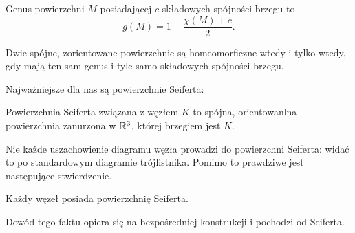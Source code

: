 \begin{definition} 
    Genus powierzchni $M$ posiadającej $c$ składowych spójności brzegu to
    \[
        g(M) = 1 - \frac{\chi(M) + c}{2}.
    \]
\end{definition}

\begin{proposition}
    Dwie spójne, zorientowane powierzchnie są homeomorficzne wtedy i tylko
    wtedy, gdy mają ten sam genus i tyle samo składowych spójności brzegu.
\end{proposition}

Najważniejsze dla nas są powierzchnie Seiferta:

\begin{definition} 
    Powierzchnia Seiferta związana z węzłem $K$ to spójna,
    orientowanlna powierzchnia zanurzona w $\mathbb R^3$, której brzegiem jest $K$.
\end{definition}


Nie każde uszachowienie diagramu węzła prowadzi do powierzchni Seiferta:
widać to po standardowym diagramie trójlistnika.
Pomimo to prawdziwe jest następujące stwierdzenie.

\begin{proposition}
    Każdy węzeł posiada powierzchnię Seiferta.
\end{proposition}

Dowód tego faktu opiera się na bezpośredniej konstrukcji i pochodzi od Seiferta.


